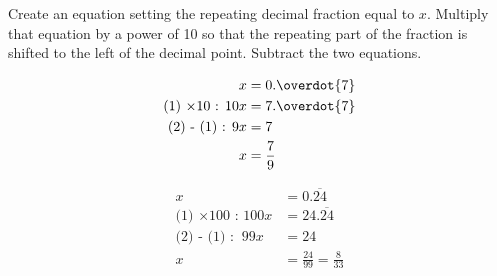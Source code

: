 \documentclass{article}
\begin{document}
Create an equation setting the repeating decimal fraction  equal to $x$. Multiply that equation by a power of 10 so that the repeating part of the fraction is shifted to the left of the decimal point. Subtract the two equations.


\begin{align}
                            x&=0.\overdot{7}\\
\text{(1) $\times 10$ : } 10x&=7.\overdot{7}\\
      \text{(2) - (1) : }  9x&=7\\
                            x&=\frac{7}{9}
\end{align}

\setcounter{equation}{0}

\begin{align}
x&=0.\overline{24}\\
\text{(1) $\times 100$ : }
100x&=24.\overline{24}\\
\text{(2) - (1) : }
\ 99x&=24\\
x&=\frac{24}{99}=\frac{8}{33}
\end{align}
\end{document}
